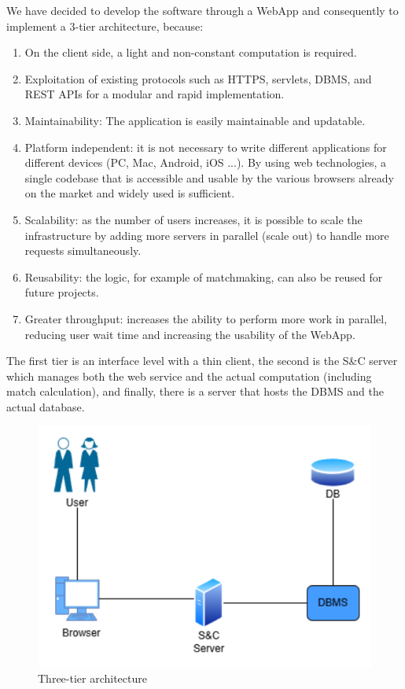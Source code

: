 \documentclass{article}
\begin{document}
We have decided to develop the software through a WebApp and consequently to implement a 3-tier architecture, because: 
\begin{enumerate}
    \item On the client side, a light and non-constant computation is required. 
    \item Exploitation of existing protocols such as HTTPS, servlets, DBMS, and REST APIs for a modular and rapid implementation.
    \item Maintainability: The application is easily maintainable and updatable. 
    \item Platform independent: it is not necessary to write different applications for different devices (PC, Mac, Android, iOS ...). By using web technologies, a single codebase that is accessible and usable by the various browsers already on the market and widely used is sufficient. 
    \item Scalability: as the number of users increases, it is possible to scale the infrastructure by adding more servers in parallel (scale out) to handle more requests simultaneously. 
    \item Reusability: the logic, for example of matchmaking, can also be reused for future projects. 
    \item Greater throughput: increases the ability to perform more work in parallel, reducing user wait time and increasing the usability of the WebApp. 
\end{enumerate}
The first tier is an interface level with a thin client, the second is the S\&C server which manages both the web service and the actual computation (including match calculation), and finally, there is a server that hosts the DBMS and the actual database.  

\begin{figure}[H]
    \centering
    \includegraphics[width=0.5\linewidth]{overview.png}
    \caption{Three-tier architecture}
    \label{fig:enter-label}
\end{figure}
\end{document}

